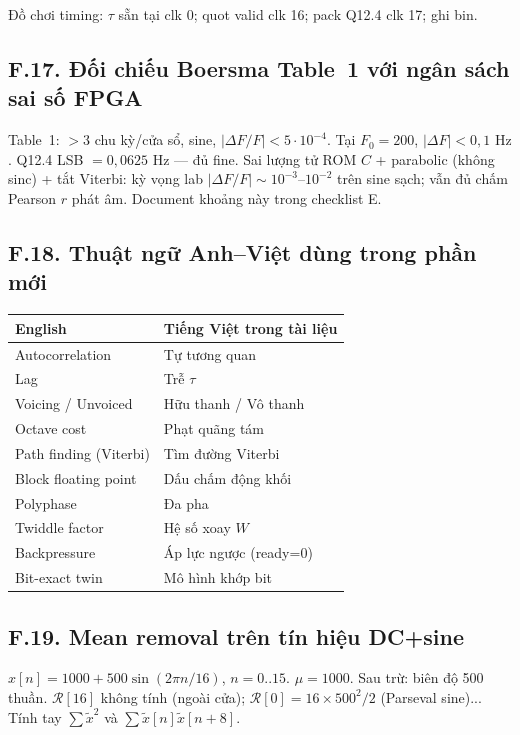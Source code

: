 Đồ chơi timing: $\tau$ sẵn tại clk 0; quot valid clk 16; pack Q12.4 clk 17; ghi bin.

\subsection*{F.17. Đối chiếu Boersma Table~1 với ngân sách sai số FPGA}

Table~1: $>3$ chu kỳ/cửa sổ, sine, $|\Delta F/F|<5\cdot10^{-4}$.
Tại $F_0=200$, $|\Delta F|<0{,}1\text{ Hz}$. Q12.4 LSB $=0{,}0625\text{ Hz}$ --- đủ fine.
Sai lượng tử ROM $C$ + parabolic (không sinc) + tắt Viterbi: kỳ vọng lab $|\Delta F/F|\sim10^{-3}$--$10^{-2}$ trên sine sạch; vẫn đủ chấm Pearson $r$ phát âm. Document khoảng này trong checklist E.

\subsection*{F.18. Thuật ngữ Anh--Việt dùng trong phần mới}

\begin{center}\small
\begin{tabular}{@{}ll@{}}
\toprule
English & Tiếng Việt trong tài liệu \\
\midrule
Autocorrelation & Tự tương quan \\
Lag & Trễ $\tau$ \\
Voicing / Unvoiced & Hữu thanh / Vô thanh \\
Octave cost & Phạt quãng tám \\
Path finding (Viterbi) & Tìm đường Viterbi \\
Block floating point & Dấu chấm động khối \\
Polyphase & Đa pha \\
Twiddle factor & Hệ số xoay $W$ \\
Backpressure & Áp lực ngược (ready=0) \\
Bit-exact twin & Mô hình khớp bit \\
\bottomrule
\end{tabular}
\end{center}

\subsection*{F.19. Mean removal trên tín hiệu DC+sine}
$x[n]=1000+500\sin(2\pi n/16)$, $n=0..15$. $\mu=1000$. Sau trừ: biên độ 500 thuần. $\mathcal{R}[16]$ không tính (ngoài cửa); $\mathcal{R}[0]=16\times500^2/2$ (Parseval sine)... Tính tay $\sum\tilde x^2$ và $\sum\tilde x[n]\tilde x[n+8]$.

